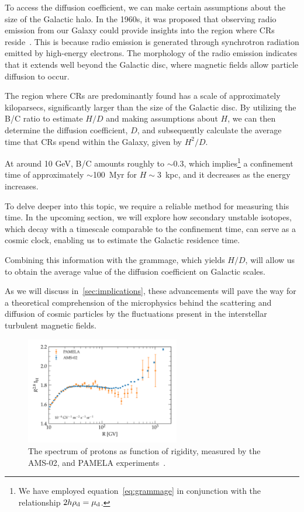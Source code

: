 To access the diffusion coefficient, we can make certain assumptions about the size of the Galactic halo. 
%
In the 1960s, it was proposed that observing radio emission from our Galaxy could provide insights into the region where CRs reside~\cite{Ginzburg1961ptps}. This is because radio emission is generated through synchrotron radiation emitted by high-energy electrons. The morphology of the radio emission indicates that it extends well beyond the Galactic disc, where magnetic fields allow particle diffusion to occur.

The region where CRs are predominantly found has a scale of approximately kiloparsecs, significantly larger than the size of the Galactic disc. By utilizing the B/C ratio to estimate $H/D$ and making assumptions about $H$, we can then determine the diffusion coefficient, $D$, and subsequently calculate the average time that CRs spend within the Galaxy, given by $H^2/D$. 

At around 10 GeV, B/C amounts roughly to $\sim 0.3$, which implies\footnote{We have employed equation~\eqref{eq:grammage} in conjunction with the relationship $2h \rho_{\rm d} = \mu_{\rm d}$.} a confinement time of approximately $\sim$100~Myr for $H \sim 3$~kpc, and it decreases as the energy increases.

To delve deeper into this topic, we require a reliable method for measuring this time. In the upcoming section, we will explore how secondary unstable isotopes, which decay with a timescale comparable to the confinement time, can serve as a cosmic clock, enabling us to estimate the Galactic residence time.

Combining this information with the grammage, which yields $H/D$, will allow us to obtain the average value of the diffusion coefficient on Galactic scales.

As we will discuss in~\ref{sec:implications}, these advancements will pave the way for a theoretical comprehension of the microphysics behind the scattering and diffusion of cosmic particles by the fluctuations present in the interstellar turbulent magnetic fields.

\begin{figure}
\centering
\includegraphics[width=0.6\textwidth]{figures/protons_he.pdf}
\caption{The spectrum of protons as function of rigidity, measured by the AMS-02, and PAMELA experiments~\cite{AMS02results,PAMELA.2011.proton}.}
\label{fig:protonshe}
\end{figure}

